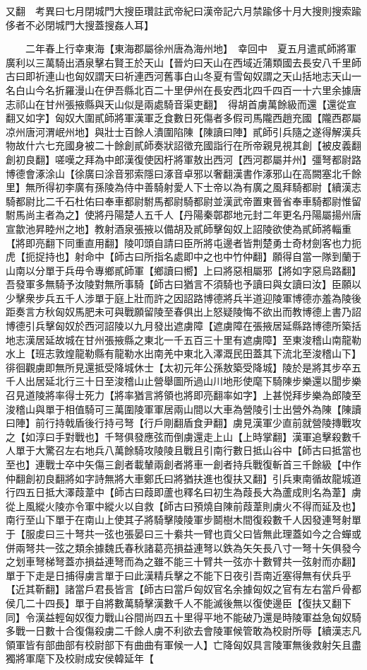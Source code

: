 又翻　考異曰七月閉城門大搜臣瓚註武帝紀曰漢帝記六月禁踰侈十月大搜則搜索踰侈者不必閉城門大搜蓋搜姦人耳】

　　二年春上行幸東海【東海郡屬徐州唐為海州地】　幸回中　夏五月遣貳師將軍廣利以三萬騎出酒泉擊右賢王於天山【晉灼曰天山在西域近蒲類國去長安八千里師古曰即祈連山也匈奴謂天曰祈連西河舊事白山冬夏有雪匈奴謂之天山括地志天山一名白山今名折羅漫山在伊吾縣北百二十里伊州在長安西北四千四百一十六里余據唐志祁山在甘州張掖縣與天山似是兩處騎音渠吏翻】　得胡首虜萬餘級而還【還從宣翻又如字】匈奴大圍貳師將軍漢軍乏食數日死傷者多假司馬隴西趙充國【隴西郡屬凉州唐河渭岷州地】與壯士百餘人潰圍陷陳【陳讀曰陣】貳師引兵隨之遂得解漢兵物故什六七充國身被二十餘創貳師奏狀詔徵充國詣行在所帝親見視其創【被皮義翻創初良翻】嗟嘆之拜為中郎漢復使因杅將軍敖出西河【西河郡屬并州】彊弩都尉路博德會涿涂山【徐廣曰涂音邪索隱曰涿音卓邪以奢翻漢書作涿邪山在高闕塞北千餘里】無所得初李廣有孫陵為侍中善騎射愛人下士帝以為有廣之風拜騎都尉【續漢志騎都尉比二千石杜佑曰奉車都尉駙馬都尉騎都尉並漢武帝置東晉省奉車騎都尉惟留駙馬尚主者為之】使將丹陽楚人五千人【丹陽秦鄣郡地元封二年更名丹陽屬揚州唐宣歙池昇睦州之地】教射酒泉張掖以備胡及貳師擊匈奴上詔陵欲使為貳師將輜重【將即亮翻下同重直用翻】陵叩頭自請曰臣所將屯邊者皆荆楚勇士奇材劍客也力扼虎【扼捉持也】射命中【師古曰所指名處即中之也中竹仲翻】願得自當一隊到蘭于山南以分單于兵毋令專鄉貳師軍【鄉讀曰嚮】上曰將惡相屬邪【將如字惡烏路翻】吾發軍多無騎予汝陵對無所事騎【師古曰猶言不須騎也予讀曰與女讀曰汝】臣願以少擊衆步兵五千人涉單于庭上壯而許之因詔路博德將兵半道迎陵軍博德亦羞為陵後距奏言方秋匈奴馬肥未可與戰願留陵至春俱出上怒疑陵悔不欲出而教博德上書乃詔博德引兵擊匈奴於西河詔陵以九月發出遮虜障【遮虜障在張掖居延縣路博德所築括地志漢居延故城在甘州張掖縣之東北一千五百三十里有遮虜障】至東浚稽山南龍勒水上【班志敦煌龍勒縣有龍勒水出南羌中東北入澤溉民田蓋其下流北至浚稽山下】徘徊觀虜即無所見還抵受降城休士【太初元年公孫敖築受降城】陵於是將其步卒五千人出居延北行三十日至浚稽山止營舉圖所過山川地形使麾下騎陳步樂還以聞步樂召見道陵將率得士死力【將率猶言將領也將即亮翻率如字】上甚悦拜步樂為郎陵至浚稽山與單于相值騎可三萬圍陵軍軍居兩山間以大車為營陵引士出營外為陳【陳讀曰陣】前行持戟盾後行持弓弩【行戶剛翻盾食尹翻】虜見漢軍少直前就營陵摶戰攻之【如淳曰手對戰也】千弩俱發應弦而倒虜還走上山【上時掌翻】漢軍追擊殺數千人單于大驚召左右地兵八萬餘騎攻陵陵且戰且引南行數日抵山谷中【師古曰抵當也至也】連戰士卒中矢傷三創者載輦兩創者將車一創者持兵戰復斬首三千餘級【中作仲翻創初良翻將如字詩無將大車鄭氏曰將猶扶進也復扶又翻】引兵東南循故龍城道行四五日抵大澤葭葦中【師古曰葭即蘆也釋名曰初生為葭長大為蘆成則名為葦】虜從上風縱火陵亦令軍中縱火以自救【師古曰預燒自陳前葭葦則虜火不得而延及也】南行至山下單于在南山上使其子將騎擊陵陵軍步鬬樹木間復殺數千人因發連弩射單于【服䖍曰三十弩共一弦也張晏曰三十絭共一臂也貢父曰皆無此理蓋如今之合蟬或併兩弩共一弦之類余據魏氏春秋諸葛亮損益連弩以鉄為矢矢長八寸一弩十矢俱發今之划車弩梯弩蓋亦損益連弩而為之雖不能三十臂共一弦亦十數臂共一弦射而亦翻】單于下走是日捕得虜言單于曰此漢精兵擊之不能下日夜引吾南近塞得無有伏兵乎【近其靳翻】諸當戶君長皆言【師古曰當戶匈奴官名余據匈奴之官有左右當戶骨都侯几二十四長】單于自將數萬騎擊漢數千人不能滅後無以復使邊臣【復扶又翻下同】令漢益輕匈奴復力戰山谷間尚四五十里得平地不能破乃還是時陵軍益急匈奴騎多戰一日數十合復傷殺虜二千餘人虜不利欲去會陵軍候管敢為校尉所辱【續漢志凡領軍皆有部曲部有校尉部下有曲曲有軍候一人】亡降匈奴具言陵軍無後救射矢且盡獨將軍麾下及校尉成安侯韓延年【